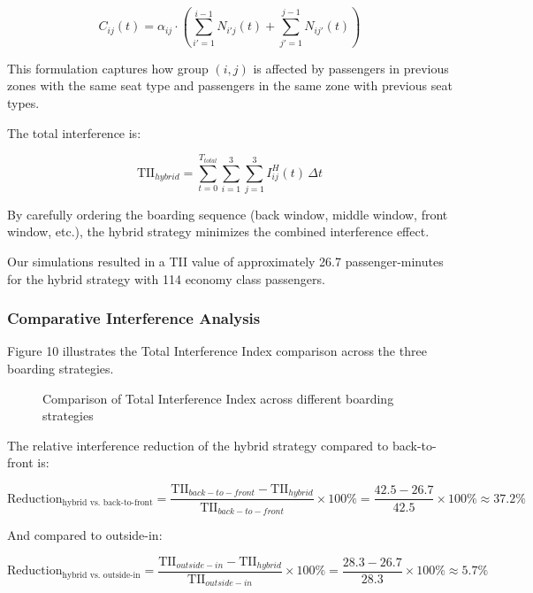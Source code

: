 \begin{equation}
C_{ij}(t) = \alpha_{ij} \cdot \left( \sum_{i'=1}^{i-1} N_{i'j}(t) + \sum_{j'=1}^{j-1} N_{ij'}(t) \right)
\end{equation}

This formulation captures how group $(i,j)$ is affected by passengers in previous zones with the same seat type and passengers in the same zone with previous seat types.

The total interference is:

\begin{equation}
\text{TII}_{hybrid} = \sum_{t=0}^{T_{total}} \sum_{i=1}^{3} \sum_{j=1}^{3} I_{ij}^{H}(t) \, \Delta t
\end{equation}

By carefully ordering the boarding sequence (back window, middle window, front window, etc.), the hybrid strategy minimizes the combined interference effect.

Our simulations resulted in a TII value of approximately 26.7 passenger-minutes for the hybrid strategy with 114 economy class passengers.

\subsubsection{Comparative Interference Analysis}

Figure 10 illustrates the Total Interference Index comparison across the three boarding strategies.

\begin{figure}[h]
\centering
\caption{Comparison of Total Interference Index across different boarding strategies}
\label{fig:interference_comparison}
\end{figure}

The relative interference reduction of the hybrid strategy compared to back-to-front is:

\begin{equation}
\text{Reduction}_{\text{hybrid vs. back-to-front}} = \frac{\text{TII}_{back-to-front} - \text{TII}_{hybrid}}{\text{TII}_{back-to-front}} \times 100\% = \frac{42.5 - 26.7}{42.5} \times 100\% \approx 37.2\%
\end{equation}

And compared to outside-in:

\begin{equation}
\text{Reduction}_{\text{hybrid vs. outside-in}} = \frac{\text{TII}_{outside-in} - \text{TII}_{hybrid}}{\text{TII}_{outside-in}} \times 100\% = \frac{28.3 - 26.7}{28.3} \times 100\% \approx 5.7\%
\end{equation}

